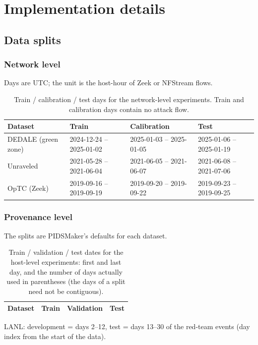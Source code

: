 \section{Implementation details}\label{app:impl}
\subsection{Data splits}
\subsubsection{Network level}
Days are UTC; the unit is the host-hour of Zeek or NFStream flows.
\begin{table}[!htbp]\centering\footnotesize\setlength{\tabcolsep}{3pt}
\caption{Train / calibration / test days for the network-level experiments. Train and calibration days contain no attack flow.}
\begin{tabularx}{\textwidth}{@{}lYYY@{}}
\toprule
Dataset & Train & Calibration & Test \\
\midrule
DEDALE (green zone) & 2024-12-24 -- 2025-01-02 & 2025-01-03 -- 2025-01-05 & 2025-01-06 -- 2025-01-19 \\
Unraveled & 2021-05-28 -- 2021-06-04 & 2021-06-05 -- 2021-06-07 & 2021-06-08 -- 2021-07-06 \\
OpTC (Zeek) & 2019-09-16 -- 2019-09-19 & 2019-09-20 -- 2019-09-22 & 2019-09-23 -- 2019-09-25 \\
\bottomrule
\end{tabularx}
\end{table}
\subsubsection{Provenance level}
The splits are PIDSMaker's defaults for each dataset.
\begin{table}[!htbp]\centering\footnotesize\setlength{\tabcolsep}{3pt}
\caption{Train / validation / test dates for the host-level experiments: first and last day, and the number of days actually used in parentheses (the days of a split need not be contiguous).}
\begin{tabularx}{\textwidth}{@{}lYYY@{}}
\toprule
Dataset & Train & Validation & Test \\
\midrule
\bottomrule
\end{tabularx}
\end{table}
LANL: development = days 2--12, test = days 13--30 of the red-team events (day index from the start of the data).

